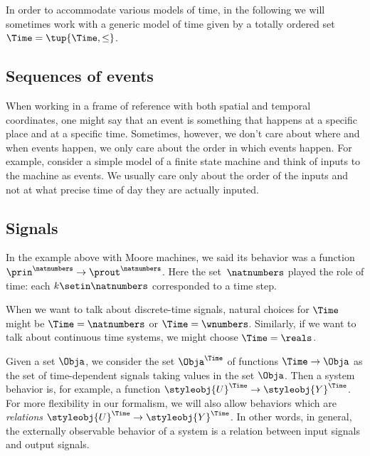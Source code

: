 In order to accommodate various models of time, in the following we will sometimes work with a generic model of time given by a totally ordered set $\Time = \tup{\Time, \leq}$. 

\subsection{Sequences of events}

When working in a frame of reference with both spatial and temporal coordinates, one might say that an event is something that happens at a specific place and at a specific time. Sometimes, however, we don't care about where and when events happen, we only care about the order in which events happen. For example, consider a simple model of a finite state machine and think of inputs to the machine as events. We usually care only about the order of the inputs and not at what precise time of day they are actually inputed. 



\subsection{Signals}



    In the example above with Moore machines, we said its behavior was a function $\prin^\natnumbers \to \prout^\natnumbers$.
    Here the set~$\natnumbers$ played the role of time: each $k \setin \natnumbers$ corresponded to a time step.
   

    When we want to talk about discrete-time signals, natural choices for $\Time$ might be $\Time = \natnumbers$ or $\Time = \wnumbers$.
    Similarly, if we want to talk about continuous time systems, we might choose $\Time = \reals$.

    Given a set $\Obja$, we consider the set $\Obja^\Time$ of functions $\Time \to \Obja$ as the set of time-dependent signals taking values in the set $\Obja$.
    Then a system behavior is, for example, a function $\styleobj{U}^\Time \to \styleobj{Y}^\Time$.
    For more flexibility in our formalism, we will also allow behaviors which are \emph{relations} $\styleobj{U}^\Time \to \styleobj{Y}^\Time$.
    In other words, in general, the externally observable behavior of a system is a relation between input signals and output signals.

